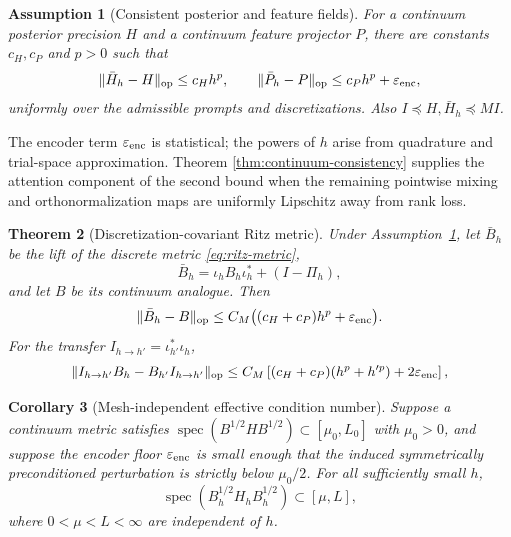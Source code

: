 \documentclass[11pt,a4paper]{article}
\numberwithin{equation}{section}
\newtheorem{theorem}{Theorem}[section]
\newtheorem{corollary}[theorem]{Corollary}
\newtheorem{assumption}[theorem]{Assumption}
\theoremstyle{definition}
\theoremstyle{remark}
\newcommand{\op}{\mathrm{op}}
\newcommand{\spec}{\operatorname{spec}}
\newcommand{\eps}{\varepsilon}
\begin{document}
\begin{assumption}[Consistent posterior and feature fields]
\label{ass:discretization}
For a continuum posterior precision $H$ and a continuum feature projector
$P$, there are constants $c_H,c_P$ and $p>0$ such that
\begin{equation}
 \|\bar H_h-H\|_\op\le c_Hh^p,
 \qquad
 \|\bar P_h-P\|_\op\le c_Ph^p+\eps_{\rm enc},
 \label{eq:operator-consistency}
\end{equation}
uniformly over the admissible prompts and discretizations.  Also
$I\preceq H,\bar H_h\preceq MI$.
\end{assumption}

The encoder term $\eps_{\rm enc}$ is statistical; the powers of $h$ arise
from quadrature and trial-space approximation.  Theorem
\ref{thm:continuum-consistency} supplies the attention component of the second
bound when the remaining pointwise mixing and orthonormalization maps are
uniformly Lipschitz away from rank loss.

\begin{theorem}[Discretization-covariant Ritz metric]
\label{thm:discretization-covariance}
Under Assumption~\ref{ass:discretization}, let $\bar B_h$ be the lift of the
discrete metric \eqref{eq:ritz-metric},
\[
 \bar B_h=\iota_hB_h\iota_h^*+(I-\Pi_h),
\]
and let $B$ be its continuum analogue.
Then
\begin{equation}
 \|\bar B_h-B\|_\op
 \le C_M\bigl((c_H+c_P)h^p+\eps_{\rm enc}\bigr).
 \label{eq:lift-convergence}
\end{equation}
For the transfer $I_{h\to h'}=\iota_{h'}^*\iota_h$,
\begin{equation}
 \|I_{h\to h'}B_h-B_{h'}I_{h\to h'}\|_\op
\le C_M\left[(c_H+c_P)(h^p+h'^p)+2\eps_{\rm enc}\right],
 \label{eq:commutator-bound}
\end{equation}
\end{theorem}

\begin{corollary}[Mesh-independent effective condition number]
\label{cor:mesh-independent}
Suppose a continuum metric satisfies
\(\spec(B^{1/2}HB^{1/2})\subset[\mu_0,L_0]\) with $\mu_0>0$, and suppose
the encoder floor $\eps_{\rm enc}$ is small enough that the induced
symmetrically preconditioned perturbation is strictly below $\mu_0/2$.
For all sufficiently small $h$,
\begin{equation}
 \spec(B_h^{1/2}H_hB_h^{1/2})\subset[\mu,L],
 \label{eq:uniform-spectrum}
\end{equation}
where $0<\mu<L<\infty$ are independent of $h$.
\end{corollary}
\end{document}
